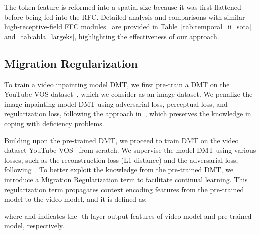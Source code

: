 \documentclass[10pt,twocolumn,letterpaper]{article}
\begin{document}
The token feature is reformed into a spatial size because it was first flattened before being fed into the RFC. Detailed analysis and comparisons with similar high-receptive-field FFC modules~\cite{suvorov22lama} are provided in Table~\ref{tab:temporal_ii_sota} and~\ref{tab:abla_largeks}, highlighting the effectiveness of our approach.


\subsection{Migration Regularization}
To train a video inpainting model DMT, we first pre-train a DMT on the YouTube-VOS dataset~\cite{youtubevos}, which we consider as an image dataset. We penalize the image inpainting model DMT using adversarial loss, perceptual loss, and  regularization loss, following the approach in~\cite{li22mat}, which preserves the knowledge in coping with deficiency problems.

Building upon the pre-trained DMT, we proceed to train DMT on the video dataset YouTube-VOS~\cite{youtubevos} from scratch. We supervise the model DMT using various losses, such as the reconstruction loss (L1 distance) and the adversarial loss, following~\cite{li22e2fgvi}. To better exploit the knowledge from the pre-trained DMT, we introduce a Migration Regularization term  to facilitate continual learning. This regularization term propagates context encoding features from the pre-trained model to the video model, and it is defined as:


where  and  indicates the -th layer output features of video model and pre-trained model, respectively.
\end{document}

